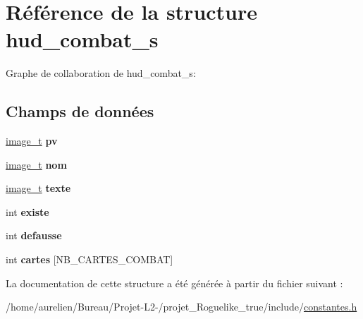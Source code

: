 \hypertarget{structhud__combat__s}{}\section{Référence de la structure hud\+\_\+combat\+\_\+s}
\label{structhud__combat__s}


Graphe de collaboration de hud\+\_\+combat\+\_\+s\+:
\subsection*{Champs de données}
\begin{DoxyCompactItemize}
\item 
\mbox{\label{structhud__combat__s_a28c214fc9281daebd5d199ba1d6fd897}} 
\hyperlink{structimage__t}{image\+\_\+t} {\bfseries pv}
\item 
\mbox{\label{structhud__combat__s_aa6504e87c00982cb5198fe41edbedebf}} 
\hyperlink{structimage__t}{image\+\_\+t} {\bfseries nom}
\item 
\mbox{\label{structhud__combat__s_a61117936135a0f6d1caeee9484b6f505}} 
\hyperlink{structimage__t}{image\+\_\+t} {\bfseries texte}
\item 
\mbox{\label{structhud__combat__s_a5847eba14653f80abc9706688e0aebf1}} 
int {\bfseries existe}
\item 
\mbox{\label{structhud__combat__s_af35b5065ba6ca7e8d4f0f483186aa743}} 
int {\bfseries defausse}
\item 
\mbox{\label{structhud__combat__s_a4e566586a4778f5e97fda3f0542aacf7}} 
int {\bfseries cartes} \mbox{[}N\+B\+\_\+\+C\+A\+R\+T\+E\+S\+\_\+\+C\+O\+M\+B\+AT\mbox{]}
\end{DoxyCompactItemize}


La documentation de cette structure a été générée à partir du fichier suivant \+:\begin{DoxyCompactItemize}
\item 
/home/aurelien/\+Bureau/\+Projet-\/\+L2-\//projet\+\_\+\+Roguelike\+\_\+true/include/\hyperlink{constantes_8h}{constantes.\+h}\end{DoxyCompactItemize}
